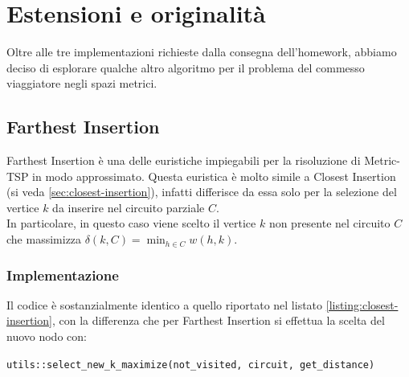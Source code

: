 \section{Estensioni e originalità}
\label{cap:extensions-and-originalities}

\noindent Oltre alle tre implementazioni richieste dalla consegna
dell'homework, abbiamo deciso di esplorare qualche altro algoritmo per il problema del commesso viaggiatore negli spazi metrici.\\

\subsection{Farthest Insertion}
\label{sec:farthest-insertion}

\noindent Farthest Insertion è una delle euristiche impiegabili per la
risoluzione di Metric-TSP in modo approssimato. Questa euristica è
molto simile a Closest Insertion (si veda
\ref{sec:closest-insertion}), infatti differisce da essa solo per la
selezione del vertice $k$ da inserire nel circuito parziale $C$.\\

\noindent In particolare, in questo caso viene scelto il vertice $k$
non presente nel circuito $C$ che massimizza $\delta (k, C) = \min_{h
  \in C} w(h, k)$.\\

\subsubsection{Implementazione}

\noindent Il codice è sostanzialmente identico a quello riportato nel
listato \ref{listing:closest-insertion}, con la differenza che per
Farthest Insertion si effettua la scelta del nuovo nodo con:

\begin{center}
\texttt{utils::select_new_k_maximize(not_visited, circuit, get_distance)}
\end{center}



